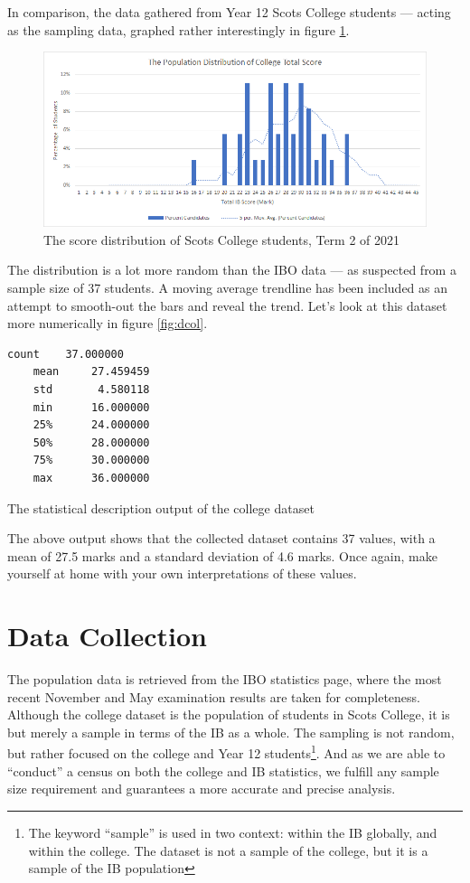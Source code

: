 \documentclass[a4paper,12pt]{tufte-handout}
\begin{document}
In comparison, the data gathered from Year 12 Scots College students --- acting as the sampling data, graphed rather interestingly in figure \ref{fig:college_total}.
\begin{figure}
    \centering
    \includegraphics[width=\textwidth]{assets/college_total.png}
    \caption{The score distribution of Scots College students, Term 2 of 2021}
    \label{fig:college_total}
\end{figure}

The distribution is a lot more random than the IBO data --- as suspected from a sample size of 37 students. A moving average trendline has been included as an attempt to smooth-out the bars and reveal the trend. Let's look at this dataset more numerically in figure \ref{fig:dcol}.

\begin{marginfigure}
    \begin{lstlisting}[language=bash]
    count    37.000000
    mean     27.459459
    std       4.580118
    min      16.000000
    25%      24.000000
    50%      28.000000
    75%      30.000000
    max      36.000000
    \end{lstlisting}
    \caption{The statistical description output of the college dataset}
    \label{fig:dcol}
\end{marginfigure}

The above output shows that the collected dataset contains 37 values, with a mean of 27.5 marks and a standard deviation of 4.6 marks. Once again, make yourself at home with your own interpretations of these values.

\section{Data Collection}
The population data is retrieved from the IBO statistics page, where the most recent November and May examination results are taken for completeness. Although the college dataset is the population of students in Scots College, it is but merely a sample in terms of the IB as a whole. The sampling is not random, but rather focused on the college and Year 12 students\footnote{The keyword ``sample'' is used in two context: within the IB globally, and within the college. The dataset is not a sample of the college, but it is a sample of the IB population}. And as we are able to ``conduct'' a census on both the college and IB statistics, we fulfill any sample size requirement and guarantees a more accurate and precise analysis.
\end{document}
